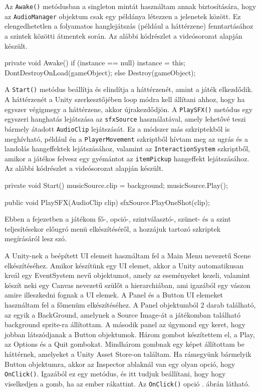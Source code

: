 Az \texttt{Awake()} metódusban a singleton mintát használtam annak biztosítására, hogy az \texttt{AudioManager} objektum csak egy példánya létezzen a jelenetek között. Ez elengedhetetlen a folyamatos hanglejátszás (például a háttérzene) fenntartásához a szintek közötti átmentek során. Az alábbi kódrészlet a \cite{youtubeplaylist} videósorozat alapján készült.

\begin{java}
private void Awake()
{
    if (instance == null)
    {
        instance = this;
        DontDestroyOnLoad(gameObject);
    }
    else 
    {
        Destroy(gameObject);
    }
}
\end{java}

A \texttt{Start()} metódus beállítja és elindítja a háttérzenét, amint a játék elkezdődik. A háttérzenét a Unity szerkesztőjében loop módra kell állítani ahhoz, hogy ha egyszer végigmegy a háttérzene, akkor újrakezdődjön. A \texttt{PlaySFX()} metódus egy egyszeri hanghatás lejátszása az \texttt{sfxSource} használatával, amely lehetővé teszi bármely átadott \texttt{AudioClip} lejátszását. Ez a módszer más szkriptekből is meghívható, például én a \texttt{PlayerMovement} szkriptből hívtam meg az ugrás és a landolás hangeffektek lejátszásához, valamint az \texttt{InteractionSystem} szkriptből, amikor a játékos felvesz egy gyémántot az \texttt{itemPickup} hangeffekt lejátszásához. Az alábbi kódrészlet a \cite{youtubeplaylist} videósorozat alapján készült.

\begin{java}
private void Start()
{
    musicSource.clip = background;
    musicSource.Play();
}

public void PlaySFX(AudioClip clip)
{
    sfxSource.PlayOneShot(clip);
}
\end{java}


Ebben a fejezetben a játékom fő-, opció-, szintválasztó-, szünet- és a szint teljesítésekor előugró menü elkészítéséről, a hozzájuk tartozó szkriptek megírásáról lesz szó.


A Unity-nek a beépített UI elemeit használtam fel a Main Menu nevezetű Scene elkészítéséhez. Amikor készítünk egy UI elemet, akkor a Unity automatikusan kreál egy EventSystem nevű objektumot, amely az eseményeket kezeli, valamint készít neki egy Canvas nevezetű szülőt a hierarchiában, ami igazából egy vászon amire illeszkedni fognak a UI elemek. A Panel és a Button UI elemeket használtam fel a főmenüm elkészítéséhez. A Panel objektumból 2 darab található, az egyik a BackGround, amelynek a Source Image-át a játékomban található background sprite-ra állítottam. A második panel az úgymond egy keret, hogy jobban látszódjanak a Button objektumok. Három gombot készítettem el, a Play, az Options és a Quit gombokat. Mindhárom gombnak egy képet állítottam be háttérnek, amelyeket a Unity Asset Store-on találtam. Ha rámegyünk bármelyik Button objektumra, akkor az Inspector ablaknál van egy olyan opció, hogy \texttt{OnClick()}. Igazából ez egy metódus, és itt tudjuk beállítani, hogy hogy viselkedjen a gomb, ha az ember rákattint. Az \texttt{OnClick()} opció . ábrán látható.

